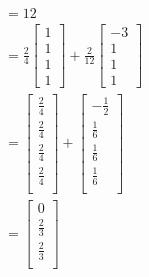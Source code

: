 \documentclass[12pt letter]{report}
\begin{document}
{{\begin{description}
\begin{align*}
                                                               & = 12                                                              \\
                                                               & = \frac{2}{4} \begin{bmatrix} 1 \\ 1\\ 1\\ 1
                                                                               \end{bmatrix} + \frac{2}{12} \begin{bmatrix} -3 \\ 1\\
                                                                                                              1  \\ 1\end{bmatrix} \\
                                                               & = \begin{bmatrix}
                                                                     \frac{2}{4} \\
                                                                     \frac{2}{4} \\
                                                                     \frac{2}{4} \\
                                                                     \frac{2}{4} \\
                                                                   \end{bmatrix} +
              \begin{bmatrix}
                -\frac{1}{2} \\
                \frac{1}{6}  \\
                \frac{1}{6}  \\
                \frac{1}{6}  \\
              \end{bmatrix}
              \\
                                                               & = \begin{bmatrix}
                                                                     0           \\
                                                                     \frac{2}{3} \\
                                                                     \frac{2}{3} \\

\end{bmatrix}
\end{align*}
\end{description}}}
\end{document}
